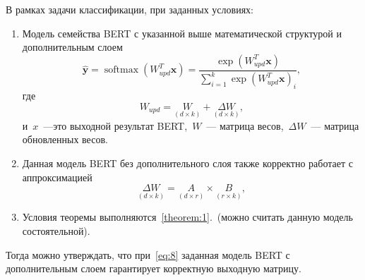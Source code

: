 \begin{theorem}
В рамках задачи классификации, при заданных условиях:
\begin{enumerate}
    \item Модель семейства BERT с указанной выше математической структурой и дополнительным слоем 
    \begin{equation}
    \label{eq:6}
        \hat{\mathbf{y}}=\operatorname{softmax}\left(W_{upd}^T \mathbf{x}\right)=\frac{\exp \left(W_{upd}^T \mathbf{x}\right)}{\sum_{i=1}^k \exp \left(W_{upd}^T \mathbf{x}\right)_i},
    \end{equation}
    где 
    \begin{equation}
    \label{eq:7}
    W_{upd} =\underset{(d \times k) }{W} + \underset{(d \times k)}{\Delta W},
    \end{equation}
    и~$x$~---это выходной результат BERT,~$W$~--- матрица весов,~$\Delta W$~--- матрица обновленных весов.
    \item  Данная модель BERT без дополнительного слоя также корректно работает с аппроксимацией 
    \begin{equation}
    \label{eq:8}
    \underset{(d \times k)}{\Delta W} = \underset{(d \times r)}{ A} \times \underset{(r \times k)}{B},
    \end{equation}
    \item Условия теоремы выполняются~\ref{theorem:1}.~(можно считать данную модель состоятельной).
\end{enumerate}
Тогда можно утверждать, что при~\eqref{eq:8} заданная модель BERT с дополнительным слоем гарантирует корректную выходную матрицу.
\end{theorem}
\renewcommand\qedsymbol{$\blacksquare$}
